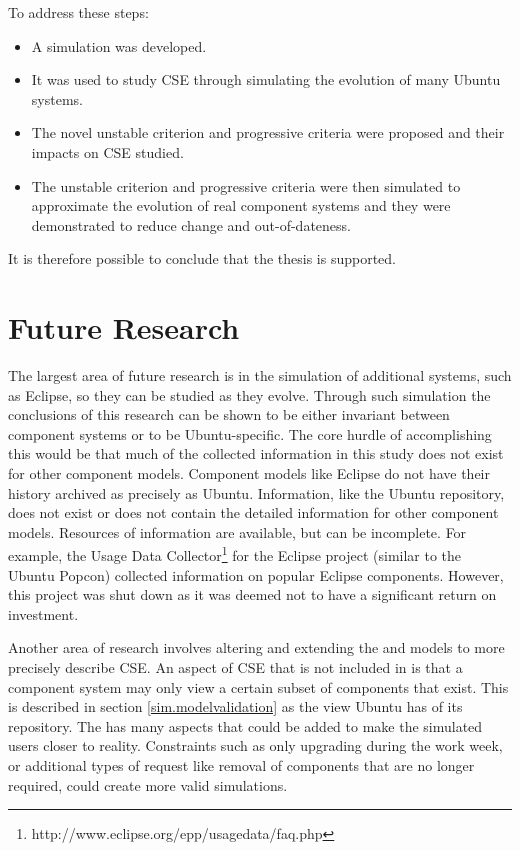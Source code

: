 To address these steps:
\begin{itemize}
  \item A simulation was developed.
  \item It was used to study CSE through simulating the evolution of many Ubuntu systems.
  \item The novel unstable criterion and progressive criteria were proposed and their impacts on CSE studied.
  \item The unstable criterion and progressive criteria were then simulated to approximate the evolution of real component systems
  and they were demonstrated to reduce change and out-of-dateness.
\end{itemize}  

It is therefore possible to conclude that the thesis is supported.
 
\section{Future Research}
\label{conclusion.futurework}
The largest area of future research is in the simulation of additional systems, such as Eclipse, 
so they can be studied as they evolve. 
Through such simulation the conclusions of this research can be shown to be either invariant between component systems 
or to be Ubuntu-specific.
The core hurdle of accomplishing this would be that much of the collected information in this study does not exist for other component models.
Component models like Eclipse do not have their history archived as precisely as Ubuntu.
Information, like the Ubuntu repository, does not exist or does not contain the detailed information for other component models.
Resources of information are available, but can be incomplete.
For example, the Usage Data Collector\footnote{http://www.eclipse.org/epp/usagedata/faq.php} for the Eclipse project (similar to the Ubuntu Popcon) collected information on popular Eclipse components. 
However, this project was shut down as it was deemed not to have a significant return on investment. 
 
Another area of research involves altering and extending the \modelname and \usermodel models to more precisely describe CSE.
An aspect of CSE that is not included in \modelname is that a component system may only view a certain subset of components that exist.
This is described in section \ref{sim.modelvalidation} as the view Ubuntu has of its repository.
The \usermodel has many aspects that could be added to make the simulated users closer to reality.
Constraints such as only upgrading during the work week, 
or additional types of request like removal of components that are no longer required, could create more valid simulations.

